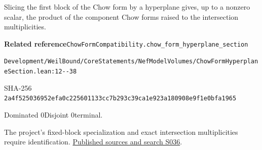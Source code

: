 
\begin{formalstatement}[D154]\label{decomp:D154}
Slicing the first block of the Chow form by a hyperplane gives, up to a nonzero scalar, the product of the component Chow forms raised to the intersection multiplicities.
\end{formalstatement}
{\small\raggedright\noindent\textsf{\bfseries Related reference}\quad \nolinkurl{ChowFormCompatibility.chow_form_hyperplane_section}\par\noindent \nolinkurl{Development/WeilBound/CoreStatements/NefModelVolumes/ChowFormHyperplaneSection.lean:12--38}\par\noindent SHA-256 \nolinkurl{2a4f525036952efa0c225601133cc7b293c39ca1e923a180908e9f1e0bfa1965}\par\noindent Dominated 0\quad Disjoint 0\quad terminal.\par}
The project’s fixed-block specialization and exact intersection multiplicities require identification.
\hyperref[lit:S036]{Published sources and search S036}.
